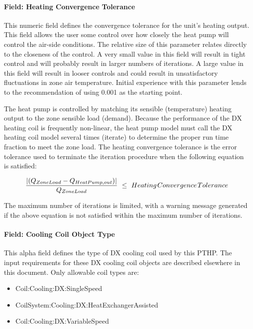 \paragraph{Field: Heating Convergence Tolerance}\label{field-heating-convergence-tolerance-3}

This numeric field defines the convergence tolerance for the unit's heating output. This field allows the user some control over how closely the heat pump will control the air-side conditions. The relative size of this parameter relates directly to the closeness of the control. A very small value in this field will result in tight control and will probably result in larger numbers of iterations. A large value in this field will result in looser controls and could result in unsatisfactory fluctuations in zone air temperature. Initial experience with this parameter lends to the recommendation of using 0.001 as the starting point.

The heat pump is controlled by matching its sensible (temperature) heating output to the zone sensible load (demand). Because the performance of the DX heating coil is frequently non-linear, the heat pump model must call the DX heating coil model several times (iterate) to determine the proper run time fraction to meet the zone load. The heating convergence tolerance is the error tolerance used to terminate the iteration procedure when the following equation is satisfied:

\begin{equation}
\frac{{\left| {({Q_{ZoneLoad}} - {Q_{HeatPump,out}})} \right|}}{{{Q_{ZoneLoad}}}}\,\, \le \,\,Heating{\kern 1pt} Convergence{\kern 1pt} Tolerance
\end{equation}

The maximum number of iterations is limited, with a warning message generated if the above equation is not satisfied within the maximum number of iterations.

\paragraph{Field: Cooling Coil Object Type}\label{field-cooling-coil-object-type-4-000}

This alpha field defines the type of DX cooling coil used by this PTHP. The input requirements for these DX cooling coil objects are described elsewhere in this document. Only allowable coil types are:

\begin{itemize}
\item
  Coil:Cooling:DX:SingleSpeed
\item
  CoilSystem:Cooling:DX:HeatExchangerAssisted
\item
  Coil:Cooling:DX:VariableSpeed
\end{itemize}

